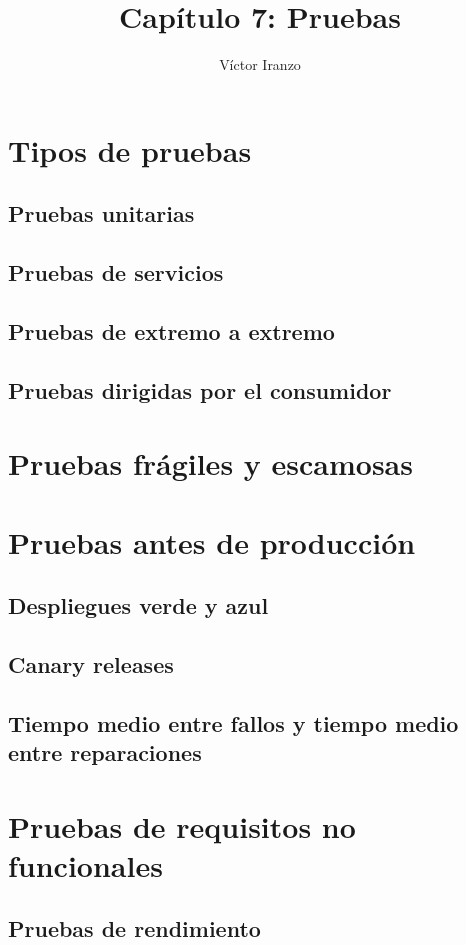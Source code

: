 \documentclass[11pt,a4paper]{article}
\author{Víctor Iranzo}
\title{Capítulo 7: Pruebas}
\begin{document}
\maketitle

\section{Tipos de pruebas}

\subsection{Pruebas unitarias}

\subsection{Pruebas de servicios}

\subsection{Pruebas de extremo a extremo}

\subsection{Pruebas dirigidas por el consumidor}

\section{Pruebas frágiles y escamosas}

\section{Pruebas antes de producción}

\subsection{Despliegues verde y azul}

\subsection{Canary releases}

\subsection{Tiempo medio entre fallos y tiempo medio entre reparaciones}

\section{Pruebas de requisitos no funcionales}

\subsection{Pruebas de rendimiento}
\end{document}

